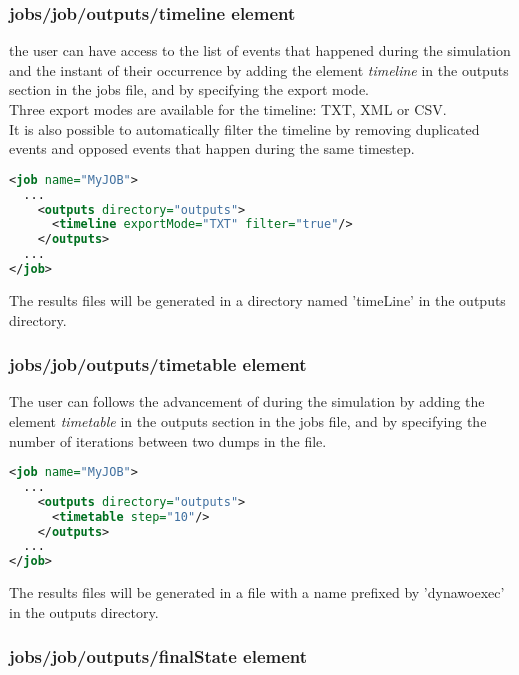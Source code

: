 \documentclass[a4paper, 12pt]{report}
\begin{document}
\subsubsection{jobs/job/outputs/timeline element}
\label{DynawoInputFiles_inputs_jobs_job_outputs_timeline}

the user can have access to the list of events that happened during the simulation and the instant of their occurrence by adding the element \textit{timeline}
in the outputs section in the jobs file, and by specifying the export mode.\\
Three export modes are available for the timeline: TXT, XML or CSV.\\
It is also possible to automatically filter the timeline by removing duplicated events and opposed events that happen during the same timestep.


\begin{lstlisting}[language=XML, morekeywords={timeline},numbers=none]
<job name="MyJOB">
  ...
    <outputs directory="outputs">
      <timeline exportMode="TXT" filter="true"/>
    </outputs>
  ...
</job>
\end{lstlisting}

The results files will be generated in a directory named 'timeLine' in the outputs directory.

\subsubsection{jobs/job/outputs/timetable element}
\label{DynawoInputFiles_inputs_jobs_job_outputs_timetable}


The user can follows the advancement of \Dynawo during the simulation by adding the element \textit{timetable}
in the outputs section in the jobs file, and by specifying the number of iterations between two dumps in the file.\\

\begin{lstlisting}[language=XML, morekeywords={timetable},numbers=none]
<job name="MyJOB">
  ...
    <outputs directory="outputs">
      <timetable step="10"/>
    </outputs>
  ...
</job>
\end{lstlisting}

The results files will be generated in a file with a name prefixed by 'dynawoexec' in the outputs directory.

\subsubsection{jobs/job/outputs/finalState element}
\label{DynawoInputFiles_inputs_jobs_job_outputs_finalState}
\end{document}
